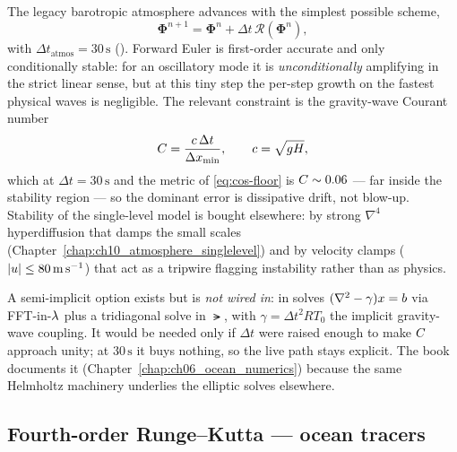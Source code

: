 The legacy barotropic atmosphere advances with the simplest possible scheme,
\begin{equation}
  \boldsymbol\Phi^{n+1} = \boldsymbol\Phi^{n} + \Delta t\,\mathcal{R}(\boldsymbol\Phi^{n}),
  \label{eq:forward-euler}
\end{equation}
with $\Delta t_{\mathrm{atmos}} = 30\,\mathrm{s}$ (). Forward Euler is
first-order accurate and only conditionally stable: for an oscillatory mode it is
\emph{unconditionally} amplifying in the strict linear sense, but at this tiny step the per-step
growth on the fastest physical waves is negligible. The relevant constraint is the
gravity-wave Courant number
\begin{equation}
  C = \frac{c\,\Delta t}{\Delta x_{\min}}, \qquad c=\sqrt{gH},
  \label{eq:cfl}
\end{equation}
which at $\Delta t=30\,\mathrm{s}$ and the metric of \eqref{eq:cos-floor} is $C\sim 0.06$ ---
far inside the stability region --- so the dominant error is dissipative drift, not blow-up.
Stability of the single-level model is bought elsewhere: by strong $\nabla^4$ hyperdiffusion that
damps the small scales (Chapter~\ref{chap:ch10_atmosphere_singlelevel}) and by velocity clamps
($|u|\le 80\,\mathrm{m\,s^{-1}}$) that act as a tripwire flagging instability rather than as
physics.


\begin{remark}
A semi-implicit option exists but is \emph{not wired in}:  in
 solves $(\nabla^{2}-\gamma)x=b$ via FFT-in-$\lambda$ plus a tridiagonal solve in
$\lat$, with $\gamma=\Delta t^2 R T_0$ the implicit gravity-wave coupling. It would be needed only
if $\Delta t$ were raised enough to make $C$ approach unity; at $30\,\mathrm{s}$ it buys
nothing, so the live path stays explicit. The book documents it (Chapter~\ref{chap:ch06_ocean_numerics})
because the same Helmholtz machinery underlies the elliptic solves elsewhere.
\end{remark}

\subsection{Fourth-order Runge--Kutta --- ocean tracers}


